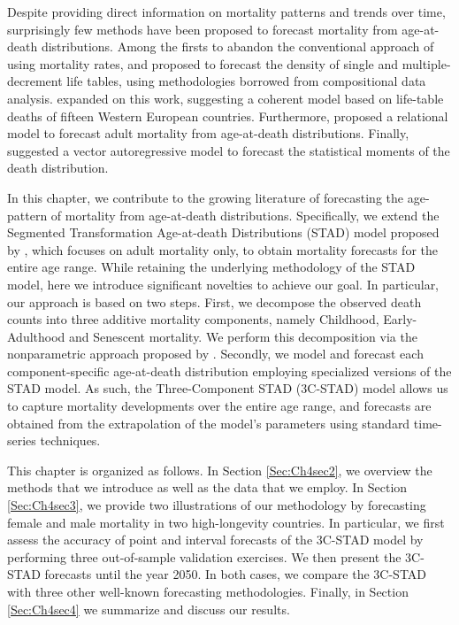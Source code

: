 \documentclass[Thesis]{subfiles}
\begin{document}
Despite providing direct information on mortality patterns and trends over time, surprisingly few methods have been proposed to forecast mortality from age-at-death distributions. Among the firsts to abandon the conventional approach of using mortality rates, \cite{oeppen2008coherent} and \cite{oeppen2013coherent} proposed to forecast the density of single and multiple-decrement life tables, using methodologies borrowed from compositional data analysis. \cite{bergeron2017coherent} expanded on this work, suggesting a coherent model based on life-table deaths of fifteen Western European countries. Furthermore, \cite{basellini2019modelling} proposed a relational model to forecast adult mortality from age-at-death distributions. Finally, \cite{pascariu2019maximum} suggested a vector autoregressive model to forecast the statistical moments of the death distribution.

In this chapter, we contribute to the growing literature of forecasting the age-pattern of mortality from age-at-death distributions. Specifically, we extend the Segmented Transformation Age-at-death Distributions (STAD) model proposed by \cite{basellini2019modelling}, which focuses on adult mortality only, to obtain mortality forecasts for the entire age range. While retaining the underlying methodology of the STAD model, here we introduce significant novelties to achieve our goal. In particular, our approach is based on two steps. First, we decompose the observed death counts into three additive mortality components, namely Childhood, Early-Adulthood and Senescent mortality. We perform this decomposition via the nonparametric approach proposed by \cite{camarda2016sums}. Secondly, we model and forecast each component-specific age-at-death distribution employing specialized versions of the STAD model. As such, the Three-Component STAD (3C-STAD) model allows us to capture mortality developments over the entire age range, and forecasts are obtained from the extrapolation of the model's parameters using standard time-series techniques. 

This chapter is organized as follows. In Section \ref{Sec:Ch4sec2}, we overview the methods that we introduce as well as the data that we employ. In Section \ref{Sec:Ch4sec3}, we provide two illustrations of our methodology by forecasting female and male mortality in two high-longevity countries. In particular, we first assess the accuracy of point and interval forecasts of the 3C-STAD model by performing three out-of-sample validation exercises. We then present the 3C-STAD forecasts until the year 2050. In both cases, we compare the 3C-STAD with three other well-known forecasting methodologies. Finally, in Section \ref{Sec:Ch4sec4} we summarize and discuss our results. 
\end{document}
